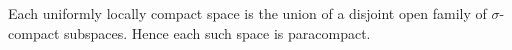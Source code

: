 Each uniformly locally compact space is the union of a disjoint open family of $\sigma$-compact subspaces. Hence each such space is paracompact.
